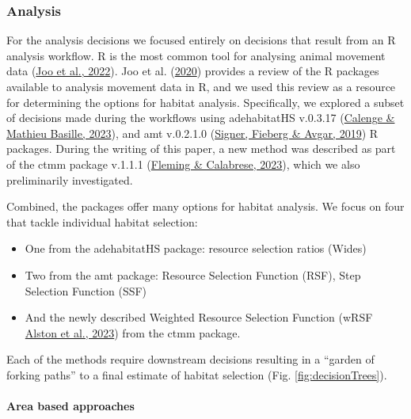 \documentclass[10pt,a4paper]{article}
\begin{document}
\begin{figure}
\end{figure}

\hypertarget{analysis}{%
\subsubsection{Analysis}\label{analysis}}

For the analysis decisions we focused entirely on decisions that result from an R analysis workflow.
R is the most common tool for analysing animal movement data (\protect\hyperlink{ref-joo_recent_2022}{Joo et al., 2022}).
Joo et al. (\protect\hyperlink{ref-joo_navigating_2020}{2020}) provides a review of the R packages available to analysis movement data in R, and we used this review as a resource for determining the options for habitat analysis.
Specifically, we explored a subset of decisions made during the workflows using adehabitatHS v.0.3.17 (\protect\hyperlink{ref-adehabitatHS}{Calenge \& Mathieu Basille, 2023}), and amt v.0.2.1.0 (\protect\hyperlink{ref-amt}{Signer, Fieberg \& Avgar, 2019}) R packages.
During the writing of this paper, a new method was described as part of the ctmm package v.1.1.1 (\protect\hyperlink{ref-ctmm}{Fleming \& Calabrese, 2023}), which we also preliminarily investigated.

Combined, the packages offer many options for habitat analysis.
We focus on four that tackle individual habitat selection:

\begin{itemize}
\item
  One from the adehabitatHS package: resource selection ratios (Wides)
\item
  Two from the amt package: Resource Selection Function (RSF), Step Selection Function (SSF)
\item
  And the newly described Weighted Resource Selection Function (wRSF \protect\hyperlink{ref-alston_mitigating_2023}{Alston et al., 2023}) from the ctmm package.
\end{itemize}

Each of the methods require downstream decisions resulting in a ``garden of forking paths'' to a final estimate of habitat selection (Fig. \ref{fig:decisionTrees}).

\hypertarget{area-based-approaches}{%
\paragraph{Area based approaches}\label{area-based-approaches}}
\end{document}

